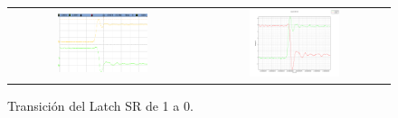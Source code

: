 \begin{figure}[H]
    \centering
    \begin{tabular}{c c}
        \includegraphics[width=0.5\textwidth]{../EJ6/Recursos/latch_sr_fall_osc} &
        \includegraphics[width=0.5\textwidth]{../EJ6/Recursos/latch_sr_fall}
    \end{tabular}
    \caption{Transición del Latch SR de 1 a 0.}
    \label{fig:latch_sr_fall_ex5}
\end{figure}